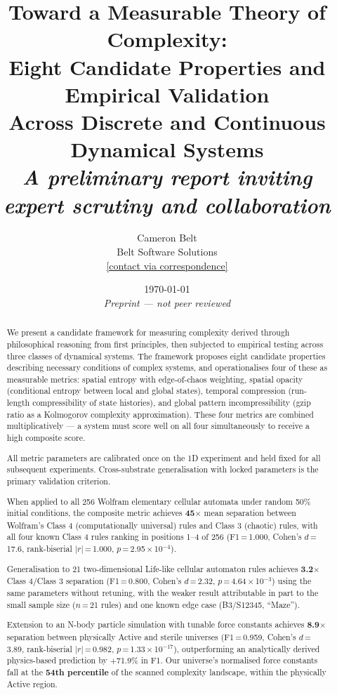 \documentclass[12pt,a4paper]{article}
\title{\textbf{Toward a Measurable Theory of Complexity:\\
Eight Candidate Properties and Empirical Validation\\
Across Discrete and Continuous Dynamical Systems}\\[0.8em]
\large\textit{A preliminary report inviting expert scrutiny and collaboration}}
\author{Cameron Belt\\
\small Belt Software Solutions\\
\small \href{mailto:}{[contact via correspondence]}}
\date{\today\\[0.3em]
\small\textit{Preprint — not peer reviewed}}
\begin{document}
\maketitle

\begin{abstract}
\noindent
We present a candidate framework for measuring complexity derived through
philosophical reasoning from first principles, then subjected to empirical
testing across three classes of dynamical systems.
The framework proposes eight candidate properties describing necessary
conditions of complex systems, and operationalises four of these as
measurable metrics: spatial entropy with edge-of-chaos weighting,
spatial opacity (conditional entropy between local and global states),
temporal compression (run-length compressibility of state histories),
and global pattern incompressibility (gzip ratio as a Kolmogorov
complexity approximation).
These four metrics are combined multiplicatively — a system must score
well on all four simultaneously to receive a high composite score.

All metric parameters are calibrated once on the 1D experiment and held
fixed for all subsequent experiments.
Cross-substrate generalisation with locked parameters is the primary
validation criterion.

When applied to all 256 Wolfram elementary cellular automata under
random 50\% initial conditions, the composite metric achieves
\textbf{45$\times$} mean separation between Wolfram's Class 4
(computationally universal) rules and Class 3 (chaotic) rules,
with all four known Class 4 rules ranking in positions 1--4 of 256
(F1\,=\,1.000, Cohen's $d$\,=\,17.6, rank-biserial $|r|$\,=\,1.000,
$p$\,=\,2.95\,×\,10$^{-4}$).

Generalisation to 21 two-dimensional Life-like cellular automaton rules
achieves \textbf{3.2$\times$} Class 4/Class 3 separation
(F1\,=\,0.800, Cohen's $d$\,=\,2.32, $p$\,=\,4.64\,×\,10$^{-3}$)
using the same parameters without retuning,
with the weaker result attributable in part to the small sample size
($n$\,=\,21 rules) and one known edge case (B3/S12345, ``Maze'').

Extension to an N-body particle simulation with tunable force constants
achieves \textbf{8.9$\times$} separation between physically Active and
sterile universes (F1\,=\,0.959, Cohen's $d$\,=\,3.89,
rank-biserial $|r|$\,=\,0.982, $p$\,=\,1.33\,×\,10$^{-17}$),
outperforming an analytically derived physics-based prediction by
$+$71.9\% in F1.
Our universe's normalised force constants fall at the
\textbf{54th percentile} of the scanned complexity landscape,
within the physically Active region.


\end{abstract}
\end{document}
